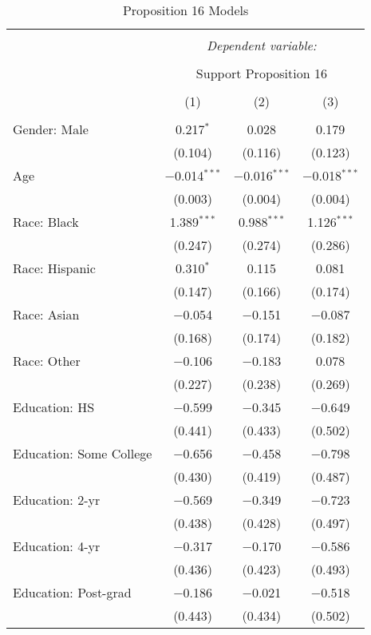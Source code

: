 
\begin{table}[!htbp] \centering 
  \caption{Proposition 16 Models} 
  \label{} 
\footnotesize 
\begin{tabular}{@{\extracolsep{5pt}}lccc} 
\\[-1.8ex]\hline 
\hline \\[-1.8ex] 
 & \multicolumn{3}{c}{\textit{Dependent variable:}} \\ 
\cline{2-4} 
\\[-1.8ex] & \multicolumn{3}{c}{Support Proposition 16} \\ 
\\[-1.8ex] & (1) & (2) & (3)\\ 
\hline \\[-1.8ex] 
 Gender: Male & 0.217$^{*}$ & 0.028 & 0.179 \\ 
  & (0.104) & (0.116) & (0.123) \\ 
  Age & $-$0.014$^{***}$ & $-$0.016$^{***}$ & $-$0.018$^{***}$ \\ 
  & (0.003) & (0.004) & (0.004) \\ 
  Race: Black & 1.389$^{***}$ & 0.988$^{***}$ & 1.126$^{***}$ \\ 
  & (0.247) & (0.274) & (0.286) \\ 
  Race: Hispanic & 0.310$^{*}$ & 0.115 & 0.081 \\ 
  & (0.147) & (0.166) & (0.174) \\ 
  Race: Asian & $-$0.054 & $-$0.151 & $-$0.087 \\ 
  & (0.168) & (0.174) & (0.182) \\ 
  Race: Other & $-$0.106 & $-$0.183 & 0.078 \\ 
  & (0.227) & (0.238) & (0.269) \\ 
  Education: HS & $-$0.599 & $-$0.345 & $-$0.649 \\ 
  & (0.441) & (0.433) & (0.502) \\ 
  Education: Some College & $-$0.656 & $-$0.458 & $-$0.798 \\ 
  & (0.430) & (0.419) & (0.487) \\ 
  Education: 2-yr & $-$0.569 & $-$0.349 & $-$0.723 \\ 
  & (0.438) & (0.428) & (0.497) \\ 
  Education: 4-yr & $-$0.317 & $-$0.170 & $-$0.586 \\ 
  & (0.436) & (0.423) & (0.493) \\ 
  Education: Post-grad & $-$0.186 & $-$0.021 & $-$0.518 \\ 
  & (0.443) & (0.434) & (0.502) \\ 

\end{tabular}
\end{table}
